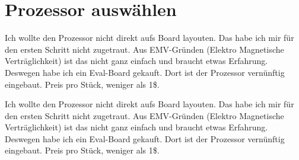 \documentclass[12pt, a4paper, oneside, draft]{article}
\begin{document}






\section{Prozessor auswählen}
Ich wollte den Prozessor nicht direkt aufs Board layouten. Das habe ich mir für den ersten Schritt nicht zugetraut. Aus EMV-Gründen (Elektro Magnetische Verträglichkeit) ist das nicht ganz einfach und braucht etwas Erfahrung. Deswegen habe ich ein Eval-Board gekauft. Dort ist der Prozessor vernünftig eingebaut. Preis pro Stück, weniger als 1\$.

Ich wollte den Prozessor nicht direkt aufs Board layouten. Das habe ich mir für den ersten Schritt nicht zugetraut. Aus EMV-Gründen (Elektro Magnetische Verträglichkeit) ist das nicht ganz einfach und braucht etwas Erfahrung. Deswegen habe ich ein Eval-Board gekauft. Dort ist der Prozessor vernünftig eingebaut. Preis pro Stück, weniger als 1\$.
\end{document}
